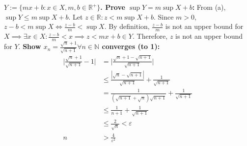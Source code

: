 \documentclass{letter}
\begin{document}
\textbf{$Y := \{mx + b : x \in X, m, b \in \mathbb{R}^+\}$. Prove
  $\sup{Y} = m\sup{X} + b$:} From (a), $\sup{Y} \leq m\sup{X} +
b$. Let $z \in \mathbb{R} : z < m\sup{X} + b$. Since $m > 0$, $z - b <
m\sup{X} \iff \frac{z - b}{m} < \sup{X}$. By definition, $\frac{z -
  b}{m}$ is not an upper bound for $X \implies \exists x \in X :
\frac{z - b}{m} < x \implies z < mx + b \in Y$. Therefore, $z$ is 
not an upper bound for $Y$.
\newpage
\textbf{Show $x_n = \frac{\sqrt{n} + 1}{\sqrt{n + 1}} \forall n \in
  \mathbb{N}$ converges (to 1):}
\begin{align*}
  \bigg| \frac{\sqrt{n} + 1}{\sqrt{n + 1}} - 1 \bigg| &= \bigg|
                                                        \frac{\sqrt{n}
                                                        + 1 - \sqrt{n
                                                        + 1}}{\sqrt{n
                                                        + 1}} \bigg| \\ 
                                                      &\leq \frac{|\sqrt{n}
                                                        - \sqrt{n +
                                                        1}|}{\sqrt{n +
                                                        1}} +
                                                        \frac{1}{\sqrt{n
                                                        + 1}} \\
                                                      &=
                                                        \frac{1}{(\sqrt{n
                                                        + 1} +
                                                        \sqrt{n})
                                                        \sqrt{n + 1}}
                                                        +
                                                        \frac{1}{\sqrt{n
                                                        + 1}} \\
                                                      &\leq \frac{1}{n
                                                        + 1} +
                                                        \frac{1}{\sqrt{n
                                                        + 1}} \\
                                                      &\leq
                                                        \frac{2}{\sqrt{n}}
                                                        < \varepsilon \\
  n &> \frac{4}{\varepsilon^2} 
\end{align*}
\end{document}
